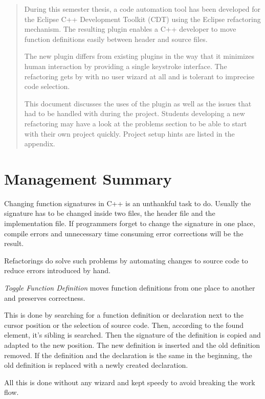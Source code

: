 \begin{abstract}

During this semester thesis, a code automation tool has been developed for the 
Eclipse C++ Development Toolkit (CDT) using the Eclipse refactoring mechanism. 
The resulting plugin enables a C++ developer to move function definitions easily 
between header and source files.

The new plugin differs from existing plugins in the way that it minimizes human 
interaction by providing a single keystroke interface. The refactoring gets by 
with no user wizard at all and is tolerant to imprecise code selection. 

This document discusses the uses of the plugin as well as the issues that had 
to be handled with during the project. Students developing a new refactoring may 
have a look at the problems section to be able to start with their own project 
quickly. Project setup hints are listed in the appendix.
\end{abstract}

\chapter*{Management Summary}
Changing function signatures in C++ is an unthankful task to do. Usually the
signature has to be changed inside two files, the header file and the
implementation file. If programmers forget to change the signature in one place,
compile errors and unnecessary time consuming error corrections will be the 
result.

Refactorings do solve such problems by automating changes to source code to 
reduce errors introduced by hand.

\textit{Toggle Function Definition} moves function definitions from one place
to another and preserves correctness.

This is done by searching for a function definition or declaration next to the
cursor position or the selection of source code. Then, according to the found
element, it's sibling is searched. Then the signature of the definition is
copied and adapted to the new position. The new definition is inserted and
the old definition removed.
If the definition and the declaration is the same in the beginning, the old
definition is replaced with a newly created declaration.

All this is done without any wizard and kept speedy to avoid breaking the work 
flow.
\thispagestyle{empty}
\pagebreak

